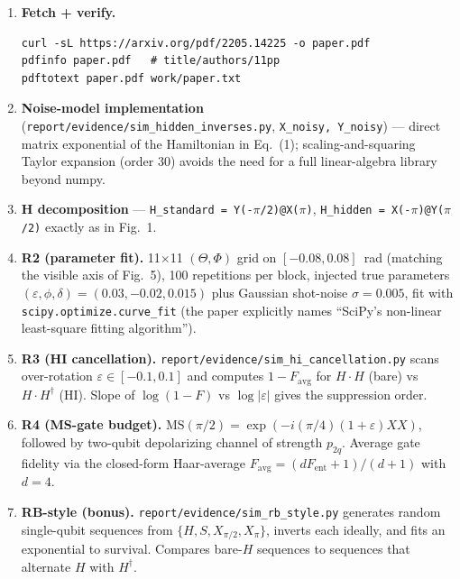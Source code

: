 \documentclass[11pt]{article}
\begin{document}
\begin{enumerate}[leftmargin=1.4em]
\item \textbf{Fetch + verify.}
\begin{lstlisting}
curl -sL https://arxiv.org/pdf/2205.14225 -o paper.pdf
pdfinfo paper.pdf   # title/authors/11pp
pdftotext paper.pdf work/paper.txt
\end{lstlisting}
\item \textbf{Noise-model implementation} (\texttt{report/evidence/sim\_hidden\_inverses.py}, \texttt{X\_noisy, Y\_noisy}) — direct matrix exponential of the Hamiltonian in Eq.~(1); scaling-and-squaring Taylor expansion (order 30) avoids the need for a full linear-algebra library beyond numpy.
\item \textbf{H decomposition} — \texttt{H\_standard = Y(-\(\pi\)/2)@X(\(\pi\))}, \texttt{H\_hidden = X(-\(\pi\))@Y(\(\pi\)/2)} exactly as in Fig.~1.
\item \textbf{R2 (parameter fit).} 11\(\times\)11 \((\Theta,\Phi)\) grid on \([-0.08,0.08]\)~rad (matching the visible axis of Fig.~5), 100 repetitions per block, injected true parameters \((\varepsilon,\phi,\delta)=(0.03,-0.02,0.015)\) plus Gaussian shot-noise \(\sigma=0.005\), fit with \texttt{scipy.optimize.curve\_fit} (the paper explicitly names ``SciPy's non-linear least-square fitting algorithm'').
\item \textbf{R3 (HI cancellation).} \texttt{report/evidence/sim\_hi\_cancellation.py} scans over-rotation \(\varepsilon\in[-0.1,0.1]\) and computes \(1-F_{\text{avg}}\) for \(H\cdot H\) (bare) vs \(H\cdot H^{\dagger}\) (HI). Slope of \(\log(1-F)\) vs \(\log|\varepsilon|\) gives the suppression order.
\item \textbf{R4 (MS-gate budget).} \(\text{MS}(\pi/2)=\exp(-i(\pi/4)(1+\varepsilon)XX)\), followed by two-qubit depolarizing channel of strength \(p_{2q}\). Average gate fidelity via the closed-form Haar-average \(F_{\text{avg}}=(dF_{\text{ent}}+1)/(d+1)\) with \(d=4\).
\item \textbf{RB-style (bonus).} \texttt{report/evidence/sim\_rb\_style.py} generates random single-qubit sequences from \(\{H,S,X_{\pi/2},X_{\pi}\}\), inverts each ideally, and fits an exponential to survival. Compares bare-\(H\) sequences to sequences that alternate \(H\) with \(H^{\dagger}\).
\end{enumerate}
\end{document}
